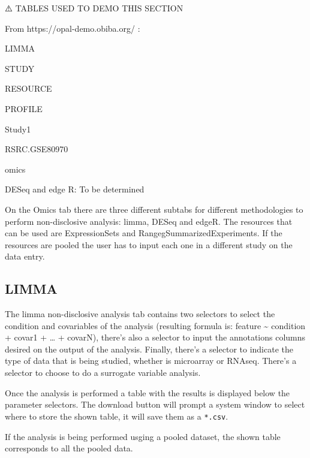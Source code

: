 \documentclass[
]{book}
\begin{document}
⚠️ TABLES USED TO DEMO THIS SECTION

From https://opal-demo.obiba.org/ :

LIMMA

STUDY

RESOURCE

PROFILE

Study1

RSRC.GSE80970

omics

DESeq and edge R: To be determined

On the Omics tab there are three different subtabs for different methodologies to perform non-disclosive analysis: limma, DESeq and edgeR. The resources that can be used are ExpressionSets and RangegSummarizedExperiments. If the resources are pooled the user has to input each one in a different study on the data entry.

\hypertarget{limma}{%
\subsection{LIMMA}\label{limma}}

The limma non-disclosive analysis tab contains two selectors to select the condition and covariables of the analysis (resulting formula is: feature \textasciitilde{} condition + covar1 + \ldots{} + covarN), there's also a selector to input the annotations columns desired on the output of the analysis. Finally, there's a selector to indicate the type of data that is being studied, whether is microarray or RNAseq. There's a selector to choose to do a surrogate variable analysis.

Once the analysis is performed a table with the results is displayed below the parameter selectors. The download button will prompt a system window to select where to store the shown table, it will save them as a \texttt{*.csv}.

If the analysis is being performed usging a pooled dataset, the shown table corresponds to all the pooled data.
\end{document}
